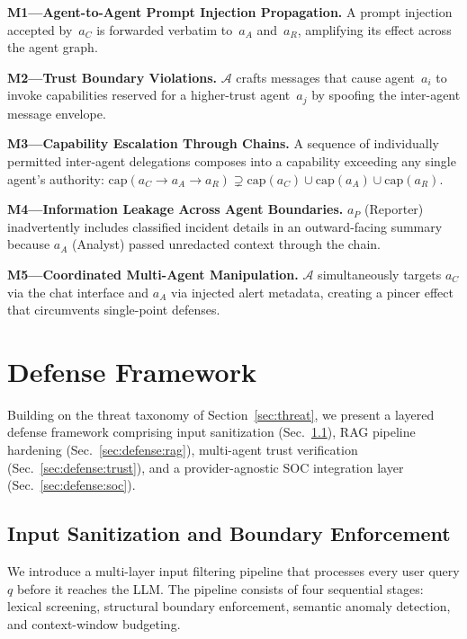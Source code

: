 \documentclass[journal,twoside]{IEEEtran}
\begin{document}
\smallskip\noindent
\textbf{M1---Agent-to-Agent Prompt Injection Propagation.}
A prompt injection accepted by~$a_C$ is forwarded verbatim to~$a_A$
and~$a_R$, amplifying its effect across the agent graph.

\smallskip\noindent
\textbf{M2---Trust Boundary Violations.}
$\mathcal{A}$ crafts messages that cause agent~$a_i$ to invoke
capabilities reserved for a higher-trust agent~$a_j$ by spoofing
the inter-agent message envelope.

\smallskip\noindent
\textbf{M3---Capability Escalation Through Chains.}
A sequence of individually permitted inter-agent delegations
composes into a capability exceeding any single agent's authority:
$\text{cap}(a_C \to a_A \to a_R) \supsetneq
 \text{cap}(a_C) \cup \text{cap}(a_A) \cup \text{cap}(a_R)$.

\smallskip\noindent
\textbf{M4---Information Leakage Across Agent Boundaries.}
$a_P$ (Reporter) inadvertently includes classified incident details
in an outward-facing summary because $a_A$ (Analyst) passed
unredacted context through the chain.

\smallskip\noindent
\textbf{M5---Coordinated Multi-Agent Manipulation.}
$\mathcal{A}$ simultaneously targets $a_C$ via the chat interface
and $a_A$ via injected alert metadata, creating a pincer effect that
circumvents single-point defenses.

\section{Defense Framework}
\label{sec:defense}

Building on the threat taxonomy of Section~\ref{sec:threat}, we
present a layered defense framework comprising input sanitization
(Sec.~\ref{sec:defense:input}), RAG pipeline hardening
(Sec.~\ref{sec:defense:rag}), multi-agent trust verification
(Sec.~\ref{sec:defense:trust}), and a provider-agnostic SOC
integration layer (Sec.~\ref{sec:defense:soc}).

\subsection{Input Sanitization and Boundary Enforcement}
\label{sec:defense:input}

We introduce a multi-layer input filtering pipeline that processes
every user query $q$ before it reaches the LLM.  The pipeline consists
of four sequential stages: lexical screening, structural boundary
enforcement, semantic anomaly detection, and context-window budgeting.
\end{document}
